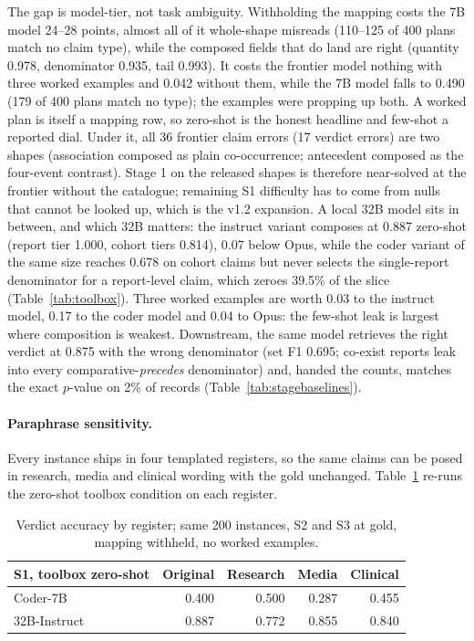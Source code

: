 The gap is model-tier, not task ambiguity. Withholding the mapping costs the 7B
model 24--28 points, almost all of it whole-shape misreads (110--125 of 400
plans match no claim type), while the composed fields that do land are right
(quantity 0.978, denominator 0.935, tail 0.993). It costs the frontier model
nothing with three worked examples and 0.042 without them, while the 7B model
falls to 0.490 (179 of 400 plans match no type); the examples were propping up
both. A worked plan is itself a mapping row, so zero-shot is the honest headline
and few-shot a reported dial. Under it, all 36 frontier claim errors (17 verdict errors) are two shapes
(association composed as plain co-occurrence; antecedent composed as the
four-event contrast). Stage 1 on the released shapes is therefore near-solved
at the frontier without the catalogue; remaining S1 difficulty has to come from
nulls that cannot be looked up, which is the v1.2 expansion.
A local 32B model sits in between, and which 32B matters: the instruct
variant composes at 0.887 zero-shot (report tier 1.000, cohort tiers 0.814),
0.07 below Opus, while the coder variant of the same size reaches 0.678 on
cohort claims but never selects the single-report denominator for a report-level
claim, which zeroes 39.5\% of the slice (Table~\ref{tab:toolbox}). Three worked
examples are worth 0.03 to the instruct model, 0.17 to the coder model and 0.04
to Opus: the few-shot leak is largest where composition is weakest. Downstream, the same model retrieves
the right verdict at 0.875 with the wrong denominator (set F1 0.695; co-exist
reports leak into every comparative-\emph{precedes} denominator) and, handed the counts, matches the
exact $p$-value on 2\% of records (Table~\ref{tab:stagebaselines}).

\paragraph{Paraphrase sensitivity.} Every instance ships in four templated
registers, so the same claims can be posed in research, media and clinical
wording with the gold unchanged. Table~\ref{tab:registers} re-runs the zero-shot
toolbox condition on each register.

\begin{table}[t]
\centering
\small
\begin{tabular}{lrrrr}
\toprule
S1, toolbox zero-shot & Original & Research & Media & Clinical \\
\midrule
Coder-7B & 0.400 & 0.500 & 0.287 & 0.455 \\
32B-Instruct & 0.887 & 0.772 & 0.855 & 0.840 \\
\bottomrule
\end{tabular}
\caption{Verdict accuracy by register; same 200 instances, S2 and S3 at gold,
mapping withheld, no worked examples.}
\label{tab:registers}
\end{table}

